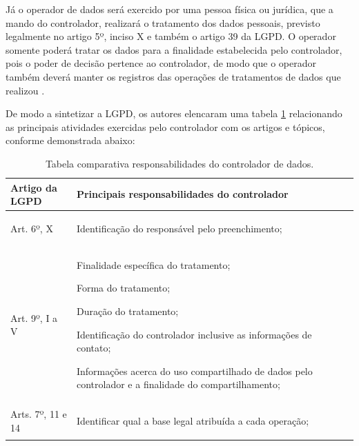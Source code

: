 \documentclass[
	12pt,				%
	openright,			%
	oneside,			%
	a4paper,			%
	english,			%
	french,				%
	spanish,			%
	brazil,				%
	]{abntex2}
\begin{document}
Já o operador de dados será exercido por uma pessoa física ou jurídica, que a mando do controlador, realizará o tratamento dos dados pessoais, previsto legalmente no artigo 5º, inciso X e também o artigo 39 da LGPD. O operador somente poderá tratar os dados para a finalidade estabelecida pelo controlador, pois o poder de decisão pertence ao controlador, de modo que o operador também deverá manter os registros das operações de tratamentos de dados que realizou \cite{01-01-LeiGeral}.

De modo a sintetizar a LGPD, os autores  elencaram uma tabela \ref{tab: responsabilidades do controlador} relacionando as principais atividades exercidas pelo controlador com os artigos e tópicos, conforme demonstrada abaixo:

\begin{table}[ht]
    \centering
    \caption{Tabela comparativa responsabilidades do controlador de dados.}
    \label{tab: responsabilidades do controlador}
    \begin{tabular}{|p{4 cm}|p{11.5cm}|p{0cm}|} 
        \hline

        \textbf{Artigo da LGPD} & \textbf{Principais responsabilidades do controlador}  \\ \hline

Art. 6º, X
&
\begin{tabitemize}
\item Identificação do responsável pelo preenchimento;
\end{tabitemize}\\ \hline
Art. 9º, I a V
&
\begin{tabitemize}
\item Finalidade específica do tratamento;
\item Forma do tratamento;
\item Duração do tratamento;
\item Identificação do controlador inclusive as informações de contato;
\item Informações acerca do uso compartilhado de dados pelo controlador e a finalidade do compartilhamento;
\end{tabitemize} \\ \hline
Arts. 7º, 11 e 14
&
\begin{tabitemize}
\item Identificar qual a base legal atribuída a cada operação;
\end{tabitemize}\\ \hline


\end{tabular}
\end{table}
\end{document}
